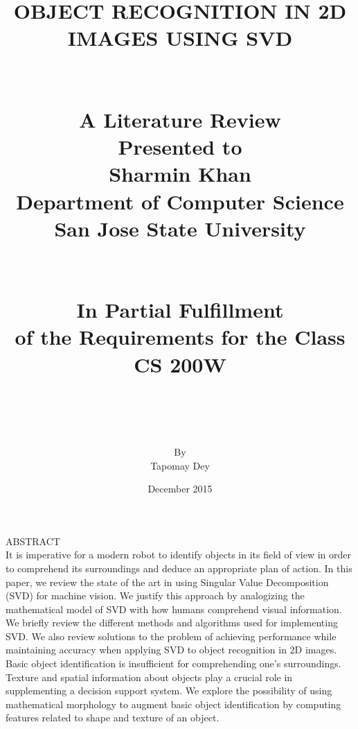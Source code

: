 \documentclass[12pt,a4paper]{article}
\begin{document}
	
	\title{
	    {OBJECT RECOGNITION IN 2D IMAGES USING SVD}\\~\\~\\
	    {\large A Literature Review}\\
	    {\large Presented to}\\
	    {\large Sharmin Khan}\\
	    {\large Department of Computer Science}\\
	    {\large San Jose State University}\\~\\~\\
	    {\large In Partial Fulfillment}\\
	    {\large of the Requirements for the Class}\\
	    {\large CS 200W}\\~\\~\\
    }
    
    \author{By\\Tapomay Dey}
    \date{December 2015}
	\maketitle
	
	\thispagestyle{empty}
	
	\newpage
	\doublespacing
	\noindent
	\large ABSTRACT\\
	It is imperative for a modern robot to identify objects in its field of view in order to comprehend its surroundings and deduce an appropriate plan of action. In this paper, we review the state of the art in using Singular Value Decomposition (SVD) for machine vision. We justify this approach by analogizing the mathematical model of SVD with how humans comprehend visual information. We briefly review the different methods and algorithms used for implementing SVD. We also review solutions to the problem of achieving performance while maintaining accuracy when applying SVD to object recognition in 2D images. Basic object identification is insufficient for comprehending one’s surroundings. Texture and spatial information about objects play a crucial role in supplementing a decision support system. We explore the possibility of using mathematical morphology to augment basic object identification by computing features related to shape and texture of an object.
    
    \thispagestyle{empty}
	\newpage
	
\end{document}
